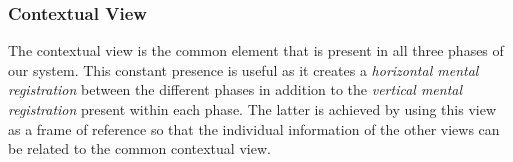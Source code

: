 \documentclass[review]{vgtc}                 %
\begin{document}
%

\subsubsection{Contextual View}\label{sec:overview:planning:3d}
The contextual view is the common element that is present in all three phases of our system. This constant presence is useful as it creates a \emph{horizontal mental registration} between the different phases in addition to the \emph{vertical mental registration} present within each phase. The latter is achieved by using this view as a frame of reference so that the individual information of the other views can be related to the common contextual view.
\end{document}
